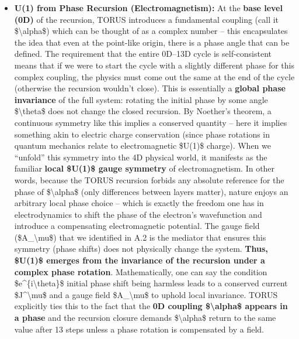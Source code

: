 \documentclass[
]{article}
\begin{document}
{\begin{itemize}
\item
  \textbf{U(1) from Phase Recursion (Electromagnetism):} At the
  \textbf{base level (0D)} of the recursion, TORUS introduces a
  fundamental coupling (call it \$\textbackslash alpha\$) which can be
  thought of as a complex number -- this encapsulates the idea that even
  at the point-like origin, there is a phase angle that can be defined.
  The requirement that the entire 0D--13D cycle is self-consistent means
  that if we were to start the cycle with a slightly different phase for
  this complex coupling, the physics must come out the same at the end
  of the cycle (otherwise the recursion wouldn't close)\hspace{0pt}.
  This is essentially a \textbf{global phase invariance} of the full
  system: rotating the initial phase by some angle
  \$\textbackslash theta\$ does not change the closed recursion. By
  Noether's theorem, a continuous symmetry like this implies a conserved
  quantity -- here it implies something akin to electric charge
  conservation (since phase rotations in quantum mechanics relate to
  electromagnetic \$U(1)\$ charge). When we ``unfold'' this symmetry
  into the 4D physical world, it manifests as the familiar \textbf{local
  \$U(1)\$ gauge symmetry} of electromagnetism\hspace{0pt}. In other
  words, because the TORUS recursion forbids any absolute reference for
  the phase of \$\textbackslash alpha\$ (only differences between layers
  matter), nature enjoys an arbitrary local phase choice -- which is
  exactly the freedom one has in electrodynamics to shift the phase of
  the electron's wavefunction and introduce a compensating
  electromagnetic potential. The gauge field (\$A\_\textbackslash mu\$)
  that we identified in A.2 is the mediator that ensures this symmetry
  (phase shifts) does not physically change the system. \textbf{Thus,
  \$U(1)\$ emerges from the invariance of the recursion under a complex
  phase rotation}. Mathematically, one can say the condition
  \$e\^{}\{i\textbackslash theta\}\$ initial phase shift being harmless
  leads to a conserved current \$J\^{}\textbackslash mu\$ and a gauge
  field \$A\_\textbackslash mu\$ to uphold local invariance. TORUS
  explicitly ties this to the fact that the \textbf{0D coupling
  \$\textbackslash alpha\$ appears in a phase} and the recursion closure
  demands \$\textbackslash alpha\$ return to the same value after 13
  steps unless a phase rotation is compensated by a field\hspace{0pt}.

\end{itemize}}
\end{document}
